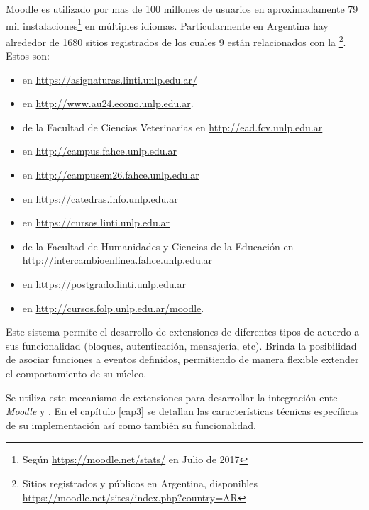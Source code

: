 Moodle es utilizado por mas de 100 millones de usuarios en aproximadamente 79 mil instalaciones\footnote{Según \url{https://moodle.net/stats/} en Julio de 2017} en múltiples idiomas. Particularmente en Argentina hay alrededor de 1680 sitios registrados de los cuales 9 están relacionados con la \unlp\footnote{Sitios registrados y públicos en Argentina, disponibles \url{https://moodle.net/sites/index.php?country=AR}}. Estos son:
\begin{itemize}
\item {} en \url{https://asignaturas.linti.unlp.edu.ar/}
\item {} en \url{http://www.au24.econo.unlp.edu.ar}.
\item {} de la Facultad de Ciencias Veterinarias en  \url{http://ead.fcv.unlp.edu.ar}
\item {} en \url{http://campus.fahce.unlp.edu.ar}
\item {} en \url{http://campusem26.fahce.unlp.edu.ar}
\item {} en \url{https://catedras.info.unlp.edu.ar}
\item {} en \url{https://cursos.linti.unlp.edu.ar}
\item {} de la Facultad de Humanidades y Ciencias de la Educación en \url{http://intercambioenlinea.fahce.unlp.edu.ar}
\item {} en \url{https://postgrado.linti.unlp.edu.ar}
\item {} en \url{http://cursos.folp.unlp.edu.ar/moodle}.
\end{itemize}

Este sistema permite el desarrollo de extensiones de diferentes tipos de acuerdo a sus funcionalidad (bloques, autenticación, mensajería, etc). Brinda la posibilidad de asociar funciones a eventos definidos, permitiendo de manera flexible extender el comportamiento de su núcleo.

Se utiliza este mecanismo de extensiones para desarrollar la integración ente \textit{Moodle} y \nombreApp. En el capítulo \ref{cap3} se detallan las características técnicas específicas de su implementación así como también su funcionalidad.

